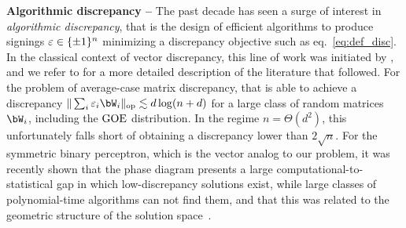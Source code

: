 \myskip 
\textbf{Algorithmic discrepancy --}
The past decade has seen a surge of interest in \emph{algorithmic discrepancy}, that is the design of efficient algorithms to produce signings 
$\varepsilon \in \{\pm 1\}^n$ minimizing a discrepancy objective such as eq.~\eqref{eq:def_disc}. 
In the classical context of vector discrepancy, this line of work was initiated by \cite{bansal2010constructive}, and we refer to \cite{bansal2023resolving,kunisky2023online} for a more detailed description of the 
literature that followed.
For the problem of average-case matrix discrepancy, \cite{kunisky2023online}  that is able to achieve a discrepancy
$\|\sum_i \eps_i \bW_i\|_\op \lesssim d \log(n+d)$ for a large class of random matrices $\bW_i$, including the $\mathrm{GOE}$ distribution.
In the regime $n = \Theta(d^2)$, this  unfortunately falls short of obtaining a discrepancy lower than $2 \sqrt{n}$. 
\noindent
For the symmetric binary perceptron, which is the vector analog to our problem, it was recently shown that the phase diagram presents a large computational-to-statistical gap
in which low-discrepancy solutions exist, while large classes of polynomial-time algorithms can not find them, and that this was related to the geometric structure of the solution space~\citep{bansal2020line,gamarnik2022algorithms}.